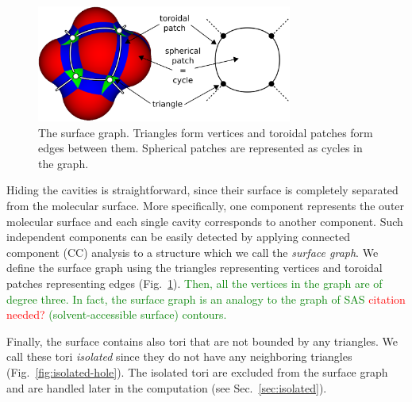 
\begin{figure}[htb]
  \centering
  \includegraphics[width=3.3in]{image/graph.png}
  \caption{The surface graph.
	Triangles form vertices and toroidal patches form edges between them.
	Spherical patches are represented as cycles in the graph.}
	\label{fig:graph}
\end{figure}

Hiding the cavities is straightforward, since their surface is completely separated from the molecular surface.
More specifically, one component represents the outer molecular surface and each single cavity corresponds to another component.
Such independent components can be easily detected by applying connected component (CC) analysis to a structure which we call the \textit{surface graph}.
We define the surface graph using the triangles representing vertices and toroidal patches representing edges 
(Fig.~\ref{fig:graph}).
\textcolor{green}{
Then, all the vertices in the graph are of degree three.
In fact, the surface graph is an analogy to the graph of SAS \textcolor{red}{citation needed?} (solvent-accessible surface) contours.
}

Finally, the surface contains also tori that are not bounded by any triangles.
We call these tori \textit{isolated} since they do not have any neighboring triangles (Fig.~\ref{fig:isolated-hole}).
The isolated tori are excluded from the surface graph and are handled later in the computation (see Sec.~\ref{sec:isolated}).

